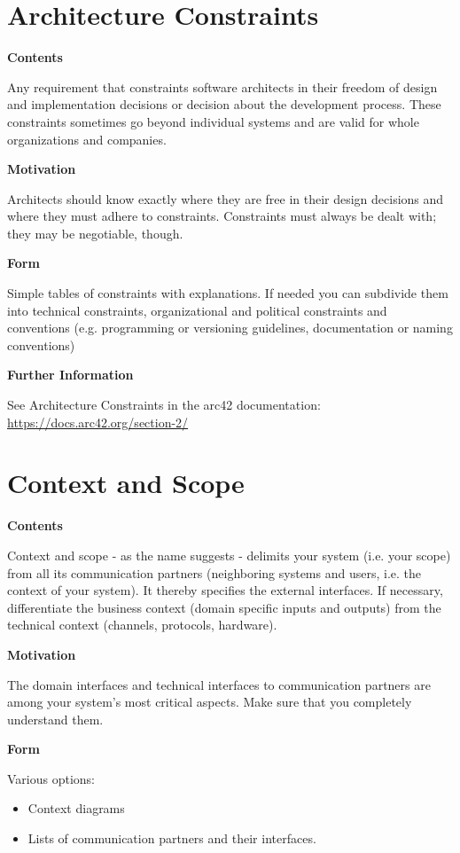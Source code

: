 \documentclass[12pt,a4paper]{article}
\newcommand{\minititle}[1]{%
  \par\addvspace{0.6\baselineskip}%
  \noindent\textbf{#1}\par\nobreak%
  \noindent\ignorespaces%
}
\begin{document}
\section{Architecture Constraints}

\minititle{Contents}
Any requirement that constraints software architects in their freedom of design and implementation decisions or decision about the development process. These constraints sometimes go beyond individual systems and are valid for whole organizations and companies.

\minititle{Motivation}
Architects should know exactly where they are free in their design decisions and where they must adhere to constraints. Constraints must always be dealt with; they may be negotiable, though.

\minititle{Form}
Simple tables of constraints with explanations. If needed you can subdivide them into technical constraints, organizational and political constraints and conventions (e.g. programming or versioning guidelines, documentation or naming conventions)

\minititle{Further Information}
See Architecture Constraints in the arc42 documentation:
\href{https://docs.arc42.org/section-2/}{https://docs.arc42.org/section-2/}

\section{Context and Scope}

\minititle{Contents}
Context and scope - as the name suggests - delimits your system (i.e. your scope) from all its communication partners (neighboring systems and users, i.e. the context of your system). It thereby specifies the external interfaces.
If necessary, differentiate the business context (domain specific inputs and outputs) from the technical context (channels, protocols, hardware).

\minititle{Motivation}
The domain interfaces and technical interfaces to communication partners are among your system’s most critical aspects. Make sure that you completely understand them.

\minititle{Form}
Various options:
\begin{itemize}
  \item Context diagrams
  \item Lists of communication partners and their interfaces.
\end{itemize}
\end{document}
